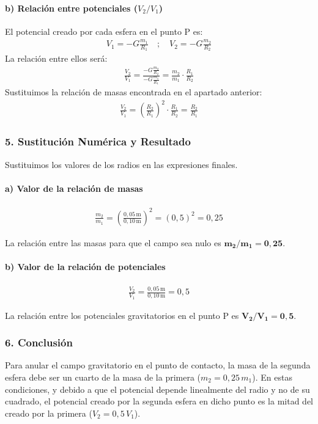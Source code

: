 \paragraph*{b) Relación entre potenciales ($V_2/V_1$)}
El potencial creado por cada esfera en el punto P es:
\begin{gather}
    V_1 = -G \frac{m_1}{R_1} \quad ; \quad V_2 = -G \frac{m_2}{R_2}
\end{gather}
La relación entre ellos será:
\begin{gather}
    \frac{V_2}{V_1} = \frac{-G \frac{m_2}{R_2}}{-G \frac{m_1}{R_1}} = \frac{m_2}{m_1} \cdot \frac{R_1}{R_2}
\end{gather}
Sustituimos la relación de masas encontrada en el apartado anterior:
\begin{gather}
    \frac{V_2}{V_1} = \left(\frac{R_2}{R_1}\right)^2 \cdot \frac{R_1}{R_2} = \frac{R_2}{R_1}
\end{gather}

\subsubsection*{5. Sustitución Numérica y Resultado}
Sustituimos los valores de los radios en las expresiones finales.
\paragraph*{a) Valor de la relación de masas}
\begin{gather}
    \frac{m_2}{m_1} = \left(\frac{0,05 \, \text{m}}{0,10 \, \text{m}}\right)^2 = (0,5)^2 = 0,25
\end{gather}
\begin{cajaresultado}
    La relación entre las masas para que el campo sea nulo es $\boldsymbol{m_2/m_1 = 0,25}$.
\end{cajaresultado}

\paragraph*{b) Valor de la relación de potenciales}
\begin{gather}
    \frac{V_2}{V_1} = \frac{0,05 \, \text{m}}{0,10 \, \text{m}} = 0,5
\end{gather}
\begin{cajaresultado}
    La relación entre los potenciales gravitatorios en el punto P es $\boldsymbol{V_2/V_1 = 0,5}$.
\end{cajaresultado}

\subsubsection*{6. Conclusión}
\begin{cajaconclusion}
    Para anular el campo gravitatorio en el punto de contacto, la masa de la segunda esfera debe ser un cuarto de la masa de la primera ($m_2 = 0,25 \, m_1$). En estas condiciones, y debido a que el potencial depende linealmente del radio y no de su cuadrado, el potencial creado por la segunda esfera en dicho punto es la mitad del creado por la primera ($V_2 = 0,5 \, V_1$).
\end{cajaconclusion}

